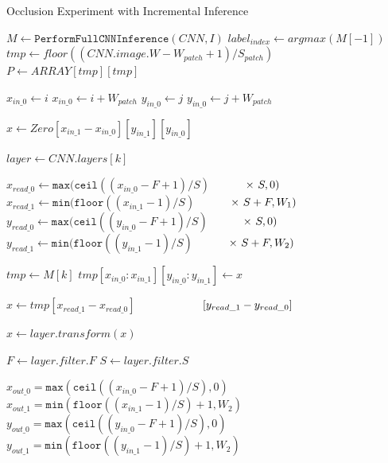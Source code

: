 \documentclass[10, sigconf]{acmart}
\begin{document}
\begin{algorithm}
\caption{Occlusion Experiment with Incremental Inference}\label{alg:inc-inference}
\begin{algorithmic}[1]

\State $M \gets \texttt{PerformFullCNNInference}(CNN, I)$
\State $label_{index} \gets argmax(M[-1])$
\State $tmp \gets floor((CNN.image.W-W_{patch}+1)/S_{patch})$
\State $P \gets ARRAY[tmp][tmp]$


      \State $x_{in\_0} \gets i$
      \State $x_{in\_0} \gets i + W_{patch}$
      \State $y_{in\_0} \gets j$
      \State $y_{in\_0} \gets j + W_{patch}$

      \State $x \gets Zero[x_{in\_1}-x_{in\_0}][y_{in\_1}][y_{in\_0}]$
      
          \State $layer \gets CNN.layers[k]$

            \State $x_{read\_0} \gets \texttt{max}(\texttt{ceil}((x_{in\_0} - F + 1)/S)$
            \State $\hspace{10mm} \times ~S, 0)$
            \State $x_{read\_1} \gets \texttt{min}(\texttt{floor}((x_{in\_1} - 1)/S)$
            \State $\hspace{10mm} \times ~S + F, W_1)$
            \State $y_{read\_0} \gets \texttt{max}(\texttt{ceil}((y_{in\_0} - F + 1)/S)$
            \State $\hspace{10mm} \times ~S, 0)$
            \State $y_{read\_1} \gets \texttt{min}(\texttt{floor}((y_{in\_1} - 1)/S)$
            \State $\hspace{10mm} \times ~S + F, W_2)$

            \State $tmp \gets M[k]$
            \State $tmp[x_{in\_0}:x_{in\_1}][y_{in\_0}:y_{in\_1}] \gets x$

            \State $x \gets tmp[x_{read\_1}-x_{read\_0}]$
            \State $\hspace{20mm}       [y_{read\_1}-y_{read\_0}]$

            \State $x \gets layer.transform(x)$

            \State $F \gets layer.filter.F$
            \State $S \gets layer.filter.S$
            
            \State $x_{out\_0} = \texttt{max}(\texttt{ceil}((x_{in\_0} - F + 1)/S), 0)$
            \State $x_{out\_1} = \texttt{min}(\texttt{floor}((x_{in\_1} - 1)/S) + 1, W_2)$
            \State $y_{out\_0} = \texttt{max}(\texttt{ceil}((y_{in\_0} - F + 1)/S), 0)$
            \State $y_{out\_1} = \texttt{min}(\texttt{floor}((y_{in\_1} - 1)/S) + 1, W_2)$
            

\end{algorithmic}
\end{algorithm}
\end{document}
